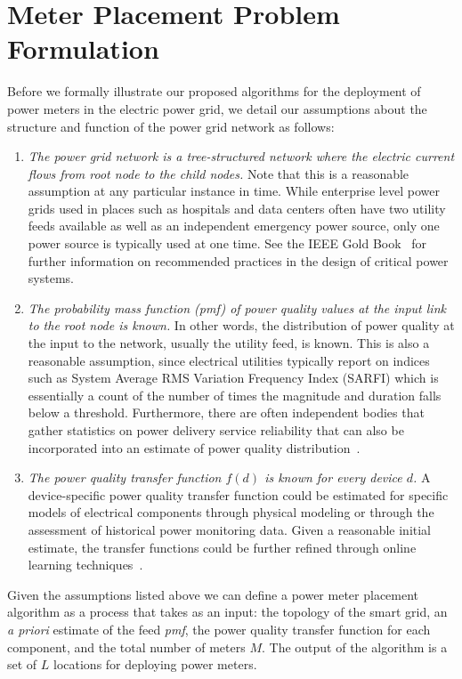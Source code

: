 \section{Meter Placement Problem Formulation}
Before we formally illustrate our proposed algorithms for the deployment of power meters in the electric power grid, we detail our assumptions about the structure and function of the power grid network as follows:

\begin{enumerate}
\item \emph{The power grid network is a tree-structured network where the electric current flows from root node to the child nodes.}
Note that this is a 
reasonable assumption at any particular instance in time. While enterprise level power grids used in places such as hospitals and data centers often have two utility feeds available as well as an independent emergency power source, only one power source is typically used at one time. See the IEEE Gold Book~\cite{goldbook} for further information on recommended practices in the design of critical power systems. 

\item \emph{The probability mass function (pmf) of power quality values at the input link to the root node is known.} In other words, the distribution of power quality at the input to the network, usually the utility feed, is known.
This is also a reasonable assumption, since electrical utilities typically report on indices such as System Average RMS Variation Frequency Index (SARFI) which is essentially a count of the number of times the magnitude and duration falls below a threshold.  
Furthermore, there are often independent bodies that gather statistics on power delivery service reliability that can also be incorporated into an estimate of power quality distribution~\cite{chowdhury2004reliability}. 

\item \emph{The power quality transfer function $f(d)$ is known for every device $d$.}  
A device-specific power quality transfer function could be estimated for specific models of electrical components 
through physical modeling or through the assessment of historical power monitoring data. 
Given a reasonable initial estimate, 
the transfer functions could be further refined through online learning techniques~\cite{catherine_pri}. 
\end{enumerate}

Given the assumptions listed above we can define a power meter placement algorithm as a process that takes as 
an input: the topology of the smart grid, an \textit{a priori} estimate of the feed \emph{pmf}, the power quality transfer function for each component, and the total number of meters $M$. The output of the algorithm is a set of $L$ locations for deploying power meters. 

